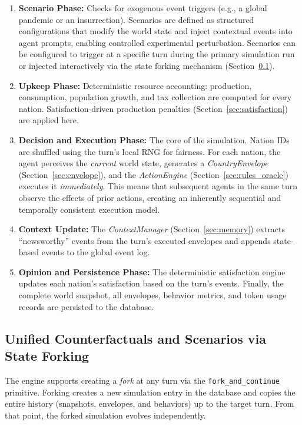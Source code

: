 \begin{enumerate}
    \item \textbf{Scenario Phase:} Checks for exogenous event triggers (e.g., a global pandemic or an insurrection). Scenarios are defined as structured configurations that modify the world state and inject contextual events into agent prompts, enabling controlled experimental perturbation. Scenarios can be configured to trigger at a specific turn during the primary simulation run or injected interactively via the state forking mechanism (Section~\ref{sec:forking}).
    \item \textbf{Upkeep Phase:} Deterministic resource accounting: production, consumption, population growth, and tax collection are computed for every nation. Satisfaction-driven production penalties (Section~\ref{sec:satisfaction}) are applied here.
    \item \textbf{Decision and Execution Phase:} The core of the simulation. Nation IDs are shuffled using the turn's local RNG for fairness. For each nation, the agent perceives the \textit{current} world state, generates a \textit{CountryEnvelope} (Section~\ref{sec:envelope}), and the \textit{ActionEngine} (Section~\ref{sec:rules_oracle}) executes it \textit{immediately}. This means that subsequent agents in the same turn observe the effects of prior actions, creating an inherently sequential and temporally consistent execution model.
    \item \textbf{Context Update:} The \textit{ContextManager} (Section~\ref{sec:memory}) extracts ``newsworthy'' events from the turn's executed envelopes and appends state-based events to the global event log.
    \item \textbf{Opinion and Persistence Phase:} The deterministic satisfaction engine updates each nation's satisfaction based on the turn's events. Finally, the complete world snapshot, all envelopes, behavior metrics, and token usage records are persisted to the database.
\end{enumerate}

\subsection{Unified Counterfactuals and Scenarios via State Forking}
\label{sec:forking}
The engine supports creating a \textit{fork} at any turn via the \texttt{fork\_and\_continue} primitive. Forking creates a new simulation entry in the database and copies the entire history (snapshots, envelopes, and behaviors) up to the target turn. From that point, the forked simulation evolves independently.

